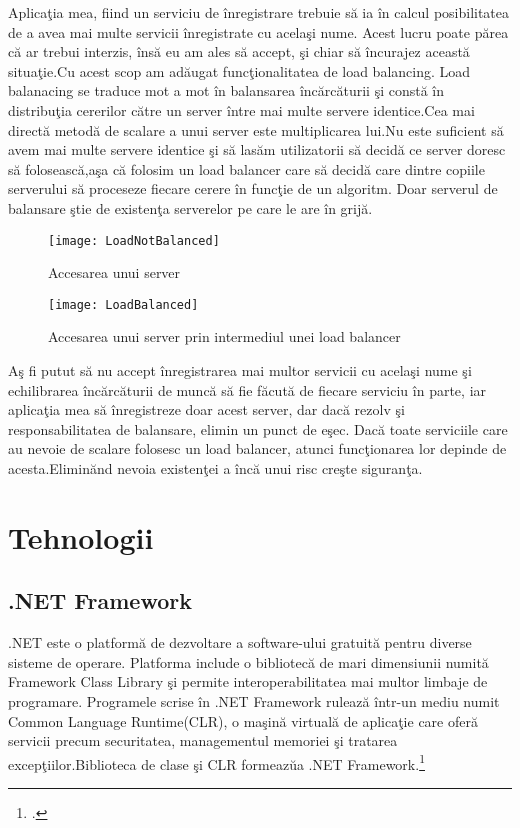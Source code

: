 \documentclass[a4paper,12pt]{report}
\begin{document}
Aplica\c tia mea, fiind un serviciu de \^inregistrare trebuie s\u a ia \^in calcul posibilitatea de a avea mai multe servicii
\^inregistrate cu acela\c si nume. Acest lucru poate p\u area c\u a ar trebui interzis, \^ins\u a eu am ales s\u a accept, \c si 
chiar s\u a \^incurajez aceast\u a situa\c tie.Cu acest scop am ad\u augat func\c tionalitatea de load balancing.
Load balanacing se traduce mot a mot \^in balansarea \^inc\u arc\u aturii \c si const\u a \^in distribu\c tia cererilor 
c\u atre un server \^intre mai multe servere identice.Cea mai direct\u a metod\u a de scalare a unui server este 
multiplicarea lui.Nu este suficient s\u a avem mai multe servere identice \c si s\u a las\u am utilizatorii s\u a
decid\u a ce server doresc s\u a foloseasc\u a,a\c sa c\u a folosim un load balancer care s\u a decid\u a care dintre
copiile serverului s\u a proceseze fiecare cerere \^in func\c tie de un algoritm. Doar serverul de balansare 
\c stie de existen\c ta serverelor pe care le are \^in grij\u a.
\begin{figure}[!htb]
	\texttt{[image: LoadNotBalanced]}
	\caption{Accesarea unui server}
	\label{fig:notLoadBalanced}
\end{figure}
\begin{figure}[!htb]
	\texttt{[image: LoadBalanced]}
	\caption{Accesarea unui server prin intermediul unei load balancer}
	\label{fig:loadBalanced}
\end{figure}

A\c s fi putut s\u a nu accept \^inregistrarea mai multor servicii cu acela\c si nume \c si echilibrarea \^inc\u arc\u aturii 
de munc\u a s\u a fie f\u acut\u a de fiecare serviciu \^in parte, iar aplica\c tia mea s\u a \^inregistreze doar acest server,
dar dac\u a rezolv \c si responsabilitatea de balansare, elimin un punct de e\c sec. Dac\u a toate serviciile care au nevoie 
de scalare folosesc un load balancer, atunci func\c tionarea lor depinde de acesta.Elimin\u and nevoia existen\c tei a \^inc\u a
unui risc cre\c ste siguran\c ta.

\chapter{Tehnologii}

\section{.NET Framework}
.NET este o platform\u a de dezvoltare a software-ului gratuit\u a pentru diverse sisteme de operare.
Platforma include o bibliotec\u a de mari dimensiunii numit\u a Framework Class Library \c si permite interoperabilitatea
mai multor limbaje de programare. Programele scrise \^in .NET Framework ruleaz\u a \^intr-un mediu numit
Common Language Runtime(CLR), o ma\c sin\u a virtual\u a de aplica\c tie care ofer\u a servicii precum
securitatea, managementul memoriei \c si tratarea excep\c tiilor.Biblioteca de clase \c si CLR formeaz\u ua 
.NET Framework.\footcite{wikidotNet}
\end{document}

